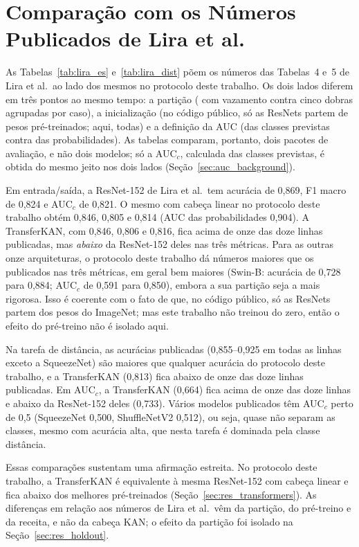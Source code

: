 \section{Comparação com os Números Publicados de Lira et al.}
\label{sec:res_lira}

As Tabelas~\ref{tab:lira_es} e~\ref{tab:lira_dist} põem os números das Tabelas~4 e~5 de Lira et al.\ ao lado dos mesmos  no protocolo deste trabalho. Os dois lados diferem em três pontos ao mesmo tempo: a partição ( com vazamento contra cinco dobras agrupadas por caso), a inicialização (no código público, só as ResNets partem de pesos pré-treinados; aqui, todas) e a definição da AUC (das classes previstas contra das probabilidades). As tabelas comparam, portanto, dois pacotes de avaliação, e não dois modelos; só a AUC$_c$, calculada das classes previstas, é obtida do mesmo jeito nos dois lados (Seção~\ref{sec:auc_background}).



Em entrada/saída, a ResNet-152 de Lira et al.\ tem acurácia de 0,869, F1 macro de 0,824 e AUC$_c$ de 0,821. O mesmo  com cabeça linear no protocolo deste trabalho obtém 0,846, 0,805 e 0,814 (AUC das probabilidades 0,904). A TransferKAN, com 0,846, 0,806 e 0,816, fica acima de onze das doze linhas publicadas, mas \emph{abaixo} da ResNet-152 deles nas três métricas. Para as outras onze arquiteturas, o protocolo deste trabalho dá números maiores que os publicados nas três métricas, em geral bem maiores (Swin-B: acurácia de 0,728 para 0,884; AUC$_c$ de 0,591 para 0,850), embora a sua partição seja a mais rigorosa. Isso é coerente com o fato de que, no código público, só as ResNets partem dos pesos do ImageNet; mas este trabalho não treinou do zero, então o efeito do pré-treino não é isolado aqui.



Na tarefa de distância, as acurácias publicadas (0,855--0,925 em todas as linhas exceto a SqueezeNet) são maiores que qualquer acurácia do protocolo deste trabalho, e a TransferKAN (0,813) fica abaixo de onze das doze linhas publicadas. Em AUC$_c$, a TransferKAN (0,664) fica acima de onze das doze linhas e abaixo da ResNet-152 deles (0,733). Vários modelos publicados têm AUC$_c$ perto de 0,5 (SqueezeNet 0,500, ShuffleNetV2 0,512), ou seja, quase não separam as classes, mesmo com acurácia alta, que nesta tarefa é dominada pela classe distância.

Essas comparações sustentam uma afirmação estreita. No protocolo deste trabalho, a TransferKAN é equivalente à mesma ResNet-152 com cabeça linear e fica abaixo dos melhores  pré-treinados (Seção~\ref{sec:res_transformers}). As diferenças em relação aos números de Lira et al.\ vêm da partição, do pré-treino e da receita, e não da cabeça KAN; o efeito da partição foi isolado na Seção~\ref{sec:res_holdout}.

